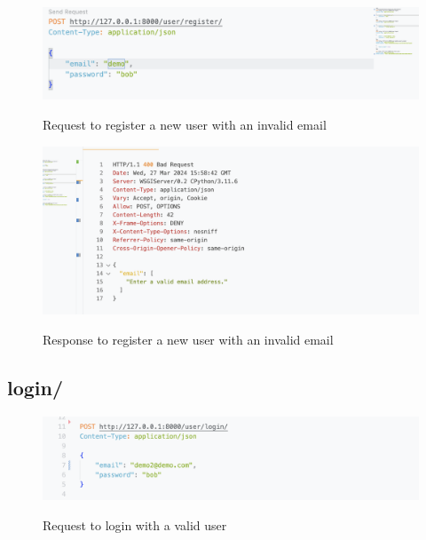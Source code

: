 \begin{figure}[H]
    \caption{Request to register a new user with an invalid email}
    \includegraphics[width=\textwidth]{Assets/api_test/request_register_invalid_email.png}
    \label{fig:request_register_invalid_email}
\end{figure}

\begin{figure}[H]
    \caption{Response to register a new user with an invalid email}
    \includegraphics[width=\textwidth]{Assets/api_test/response_register_invalid_email.png}
    \label{fig:response_register_invalid_email}
\end{figure}

\subsection{login/}
\begin{figure}[H]
    \caption{Request to login with a valid user}
    \includegraphics[width=\textwidth]{Assets/api_test/request_login_sucessful.png}
    \label{fig:request_login_sucessful}
\end{figure}

